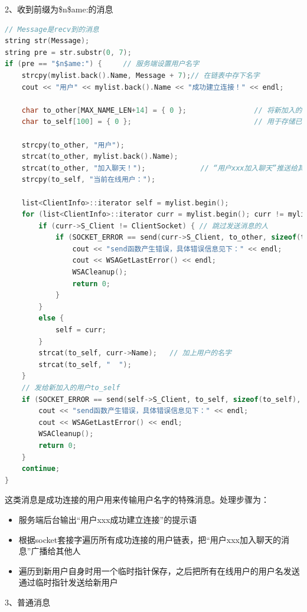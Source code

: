 \documentclass[UTF8,a4paper,10pt]{ctexart}
\begin{document}
2、收到前缀为\$n\$ame:的消息
\begin{lstlisting}[frame=trbl,language={C++}]
// Message是recv到的消息
string str(Message);
string pre = str.substr(0, 7);
if (pre == "$n$ame:") {     // 服务端设置用户名字
    strcpy(mylist.back().Name, Message + 7);// 在链表中存下名字
    cout << "用户" << mylist.back().Name << "成功建立连接！" << endl;

    char to_other[MAX_NAME_LEN+14] = { 0 };                // 将新加入的用户消息广播给其他用户
    char to_self[100] = { 0 };                             // 用于存储已在线的用户
    
    strcpy(to_other, "用户");
    strcat(to_other, mylist.back().Name);
    strcat(to_other, "加入聊天！");             // “用户xxx加入聊天”推送给其他用户
    strcpy(to_self, "当前在线用户：");

    list<ClientInfo>::iterator self = mylist.begin();
    for (list<ClientInfo>::iterator curr = mylist.begin(); curr != mylist.end(); curr++) {
        if (curr->S_Client != ClientSocket) { // 跳过发送消息的人
            if (SOCKET_ERROR == send(curr->S_Client, to_other, sizeof(to_other), 0)) {
                cout << "send函数产生错误，具体错误信息见下：" << endl;
                cout << WSAGetLastError() << endl;
                WSACleanup();
                return 0;
            }
        }
        else {
            self = curr;
        } 
        strcat(to_self, curr->Name);   // 加上用户的名字
        strcat(to_self, "  ");
    }
    // 发给新加入的用户to_self
    if (SOCKET_ERROR == send(self->S_Client, to_self, sizeof(to_self), 0)) {
        cout << "send函数产生错误，具体错误信息见下：" << endl;
        cout << WSAGetLastError() << endl;
        WSACleanup();
        return 0;
    }
    continue;
}
\end{lstlisting}\par
这类消息是成功连接的用户用来传输用户名字的特殊消息。处理步骤为：
\begin{itemize}
\item 服务端后台输出“用户xxx成功建立连接”的提示语
\item 根据socket套接字遍历所有成功连接的用户链表，把“用户xxx加入聊天的消息”广播给其他人
\item 遍历到新用户自身时用一个临时指针保存，之后把所有在线用户的用户名发送通过临时指针发送给新用户
\end{itemize}
3、普通消息
\end{document}
